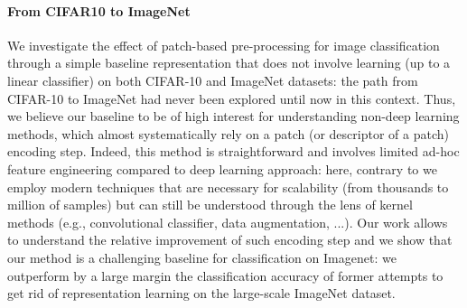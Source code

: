 \documentclass{article} %
\begin{document}
\fi




\paragraph{From CIFAR10 to ImageNet} We investigate the effect of patch-based pre-processing for image classification through a simple baseline representation that does not involve learning  (up to a linear classifier) on both CIFAR-10 and ImageNet datasets: the path from CIFAR-10 to ImageNet had never been explored until now in this context.  Thus, we believe our baseline to be of high interest for understanding non-deep learning methods, which almost systematically rely on a patch (or descriptor of a patch) encoding step.  Indeed, this method is  straightforward and involves limited ad-hoc feature engineering compared to deep learning approach: here, contrary to \citep{mairal2016end, coates2011analysis, recht2019imagenet, shankar2020neural, li2019enhanced} we  employ modern  techniques that are necessary for scalability (from thousands to million of samples) but can still be understood through the lens of kernel methods (e.g., convolutional classifier, data augmentation, ...).  Our work allows to understand the relative improvement of such encoding step and we show that our method is a challenging baseline for classification on Imagenet:  we outperform by a large margin the classification accuracy of former attempts to get rid of representation learning on the large-scale ImageNet dataset.
\end{document}
